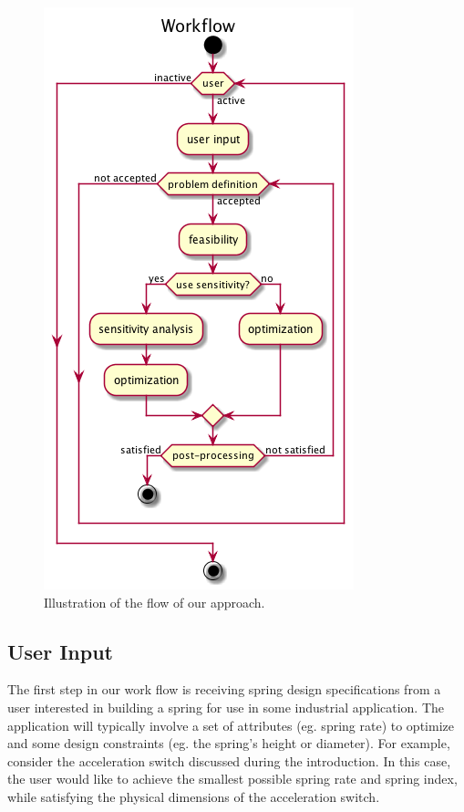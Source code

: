 \documentclass[10pt]{article}
\begin{document}
		\begin{figure}[h!]
		 \begin{center}\includegraphics[scale=.4]{IMSM_Workflow.png}\end{center}
		 \caption{Illustration of the flow of our approach.}
		 \label{Workflow}
		 
		 \end{figure}

\subsection{User Input}
\label{subsec:User_Input}

The first step in our work flow is receiving spring design specifications from a user interested in building a spring for use in some industrial application.  The application will typically involve a set of attributes (eg. spring rate) to optimize and some design constraints (eg. the spring's height or diameter).  For example, consider the acceleration switch discussed during the introduction.  In this case, the user would like to achieve the smallest possible spring rate and spring index, while satisfying the physical dimensions of the acceleration switch.
\end{document}
